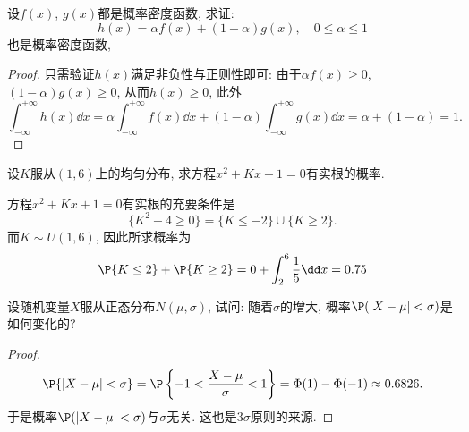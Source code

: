 \documentclass[11pt]{ctexart}
\begin{document}
\begin{example}[概率密度函数]
	设$f(x)$, $g(x)$都是概率密度函数, 求证: 
	\begin{equation*}
		h(x) = \alpha f(x) + (1-\alpha) g(x), \quad 0 \leq \alpha \leq 1
	\end{equation*}
	也是概率密度函数, 
\end{example}
\begin{proof}
	只需验证$h(x)$满足非负性与正则性即可: 由于$\alpha f(x) \geq 0$, $(1-\alpha) g(x) \geq 0$, 从而$h(x) \geq 0$, 此外
	\begin{equation*}
		\int_{-\infty}^{+\infty} h(x) \dd x
		= \alpha \int_{-\infty}^{+\infty}  f(x) \dd x + (1-\alpha) \int_{-\infty}^{+\infty}  g(x) \dd x
		= \alpha + (1-\alpha)
		= 1. 
	\end{equation*}
\end{proof}

\begin{example}[均匀分布]
	设$K$服从$(1, 6)$上的均匀分布, 求方程$x^2 + K x + 1 = 0$有实根的概率. 
\end{example}
\begin{solution}
	方程$x^2 + K x + 1 = 0$有实根的充要条件是
	\begin{equation*}
		\{K^2 - 4 \geq 0\} = \{K \leq -2\} \cup \{K \geq 2\}.  
	\end{equation*}
	而$K \sim U(1,6)$, 因此所求概率为
	\begin{equation*}
		\P\{K \leq 2\} + \P\{K \geq 2\}
		= 0 + \int_2^6 \frac{1}{5} \dd x 
		= 0.75
	\end{equation*}
\end{solution}

\begin{example}[正态分布]
	设随机变量$X$服从正态分布$N(\mu, \sigma)$, 试问: 随着$\sigma$的增大, 概率$\P(|X-\mu|<\sigma)$是如何变化的?
\end{example}
\begin{proof}
	\begin{equation*}
		\P\{|X - \mu| < \sigma\}
		= \P\left\{ -1 < \frac{X - \mu}{\sigma} < 1 \right\}
		= \Phi(1) - \Phi(-1)
		\approx 0.6826. 
	\end{equation*}
	于是概率$\P(|X-\mu|<\sigma)$与$\sigma$无关. 这也是$3\sigma$原则的来源. 
\end{proof}
\end{document}
